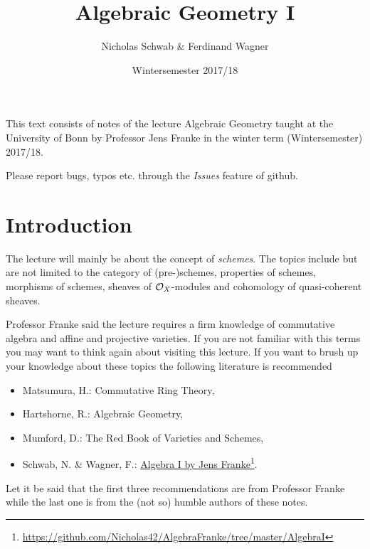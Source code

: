 \documentclass[a4paper,parskip=full,numbers=enddot]{scrreprt}
\title{Algebraic Geometry I}
\author{Nicholas Schwab \& Ferdinand Wagner}
\date{Wintersemester 2017/18}
\begin{document}
\maketitle
{}
 
This text consists of notes of the lecture Algebraic Geometry taught at the University of Bonn by Professor Jens Franke in the winter term (Wintersemester) 2017/18. 

Please report bugs, typos etc. through the \emph{Issues} feature of github.

\tableofcontents

\chapter*{Introduction}
The lecture will mainly be about the concept of \emph{schemes}. The topics include but are not limited to the category of (pre-)schemes, properties of schemes, morphisms of schemes, sheaves of $\mathcal{O}_X$-modules and cohomology of quasi-coherent sheaves.

Professor Franke said the lecture requires a firm knowledge of commutative algebra and affine and projective varieties. If you are not familiar with this terms you may want to think again about visiting this lecture. If you want to brush up your knowledge about these topics the following literature is recommended
\begin{itemize}
 \item Matsumura, H.: Commutative Ring Theory,
 \item Hartshorne, R.: Algebraic Geometry,
 \item Mumford, D.: The Red Book of Varieties and Schemes,
 \item Schwab, N. \& Wagner, F.: \href{https://github.com/Nicholas42/AlgebraFranke/tree/master/AlgebraI}{Algebra I by Jens Franke}\footnote{\url{https://github.com/Nicholas42/AlgebraFranke/tree/master/AlgebraI}}.
\end{itemize}
Let it be said that the first three recommendations are from Professor Franke while the last one is from the (not so) humble authors of these notes.
\end{document}
